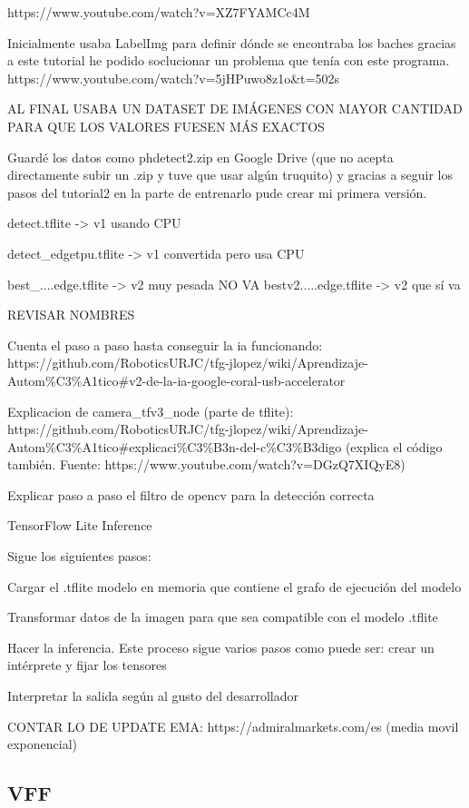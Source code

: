 https://www.youtube.com/watch?v=XZ7FYAMCc4M


Inicialmente usaba LabelImg para definir dónde se encontraba los baches gracias a este tutorial he podido soclucionar un problema que tenía con este programa.  https://www.youtube.com/watch?v=5jHPuwo8z1o\&t=502s

AL FINAL USABA UN DATASET DE IMÁGENES CON MAYOR CANTIDAD PARA QUE LOS VALORES FUESEN MÁS EXACTOS

Guardé los datos como phdetect2.zip en Google Drive (que no acepta directamente subir un .zip y tuve que usar algún truquito) y gracias a seguir los pasos del tutorial2 en la parte de entrenarlo pude crear mi primera versión.


detect.tflite -> v1 usando CPU

detect\_edgetpu.tflite -> v1 convertida pero usa CPU

best\_....edge.tflite -> v2 muy pesada NO VA
bestv2.....edge.tflite -> v2 que sí va 

REVISAR NOMBRES 


Cuenta el paso a paso hasta conseguir la ia funcionando: https://github.com/RoboticsURJC/tfg-jlopez/wiki/Aprendizaje-Autom\%C3\%A1tico\#v2-de-la-ia-google-coral-usb-accelerator 

Explicacion de camera\_tfv3\_node (parte de tflite): https://github.com/RoboticsURJC/tfg-jlopez/wiki/Aprendizaje-Autom\%C3\%A1tico\#explicaci\%C3\%B3n-del-c\%C3\%B3digo (explica el código también. Fuente: https://www.youtube.com/watch?v=DGzQ7XIQyE8)


Explicar paso a paso el filtro de opencv para la detección correcta


TensorFlow Lite Inference

Sigue los siguientes pasos:

Cargar el .tflite modelo en memoria que contiene el grafo de ejecución del modelo

Transformar datos de la imagen para que sea compatible con el modelo .tflite

Hacer la inferencia. Este proceso sigue varios pasos como puede ser: crear un intérprete y fijar los tensores

Interpretar la salida según al gusto del desarrollador



CONTAR LO DE UPDATE EMA: https://admiralmarkets.com/es  (media movil exponencial)


\subsection{VFF}
\label{subsec:softwarevff}

